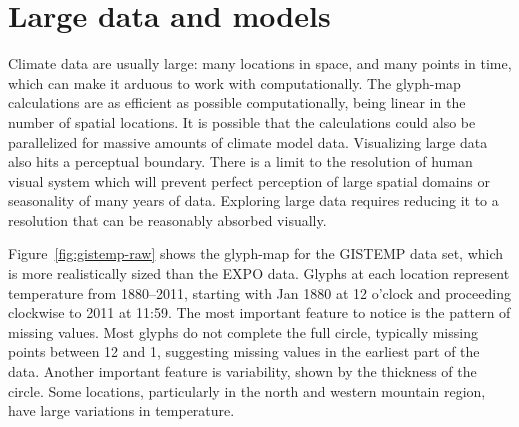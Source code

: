 \documentclass[oneside]{article}
\begin{document}

\section{Large data and models}
\label{sec:large-data}

Climate data are usually large: many locations in space, and many points in time, which can make it arduous to work with computationally. The glyph-map calculations are as efficient as possible computationally, being linear in the number of spatial locations. It is possible that the calculations could also be parallelized for massive amounts of climate model data. Visualizing large data also hits a perceptual boundary.  There is a limit to the resolution of human visual system \citep{Kr12} which will prevent perfect perception of large spatial domains or seasonality of many years of data. Exploring large data requires reducing it to a resolution that can be reasonably absorbed visually.


Figure~\ref{fig:gistemp-raw} shows the glyph-map for the GISTEMP data set, which is more realistically sized than the EXPO data. Glyphs at each location represent temperature from 1880--2011, starting with Jan 1880 at 12 o'clock and proceeding clockwise to 2011 at 11:59. The most important feature to notice is the pattern of missing values. Most glyphs do not complete the full circle, typically missing points between 12 and 1, suggesting missing values in the earliest part of the data. Another important feature is variability, shown by the thickness of the circle. Some locations, particularly in the north and western mountain region, have large variations in temperature. 
\end{document}
